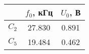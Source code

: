 \begin{tabular}{ccc}
\toprule
 & $f_0$, кГц & $U_0$, В \\
\midrule
$C_2$  & 27.830 & 0.891 \\
$C_5$  & 19.484 & 0.462 \\
\bottomrule
\end{tabular}